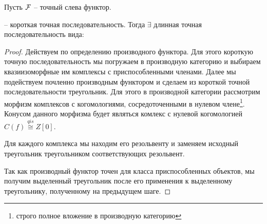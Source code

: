 \documentclass[../main.tex]{subfiles}
\begin{document}
\begin{to_claim}
Пусть $\mathcal{F}$ -- точный слева функтор.  -- короткая точная последовательность. Тогда $\exists$ длинная точная последовательность вида:
\bee
{}
\eee
\end{to_claim}
\begin{proof}
Действуем по определению производного функтора. Для этого короткую точную последовательность мы погружаем в производную категорию и выбираем квазиизоморфные им комплексы с приспособленными членами. Далее мы подействуем почленно производным функтором и сделаем из короткой точной последовательности треугольник. Для этого в производной категории рассмотрим морфизм комплексов с когомологиями, сосредоточенными в нулевом члене\footnote{строго полное вложение в производную категорию}. Конусом данного морфизма будет являться комлекс с нулевой когомологией $C(f) \overset{qis}{\cong} Z[0]$. 
\bee
{}
\eee
Для каждого комплекса мы находим его резольвенту и заменяем исходный треугольник треугольником соответствующих резольвент.
\bee
{}
\eee
Так как производный функтор точен для класса приспособленных объектов, мы получим выделенный треугольник после его применения к выделенному треугольнику, полученному на предыдущем шаге.

\end{proof}
\end{document}
